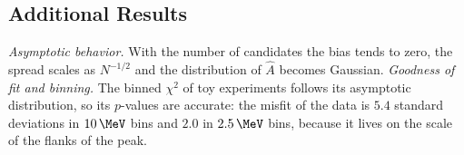 
\subsection{Additional Results}
\emph{Asymptotic behavior.} With the number of candidates the bias tends to zero, the spread scales as $N^{-1/2}$ and the distribution of $\hat A$ becomes Gaussian.
\emph{Goodness of fit and binning.} The binned $\chi^2$ of toy experiments follows its asymptotic distribution, so its $p$-values are accurate: the misfit of the data is $5.4$ standard deviations in $10\,\MeV$ bins and $2.0$ in $2.5\,\MeV$ bins, because it lives on the scale of the flanks of the peak.
